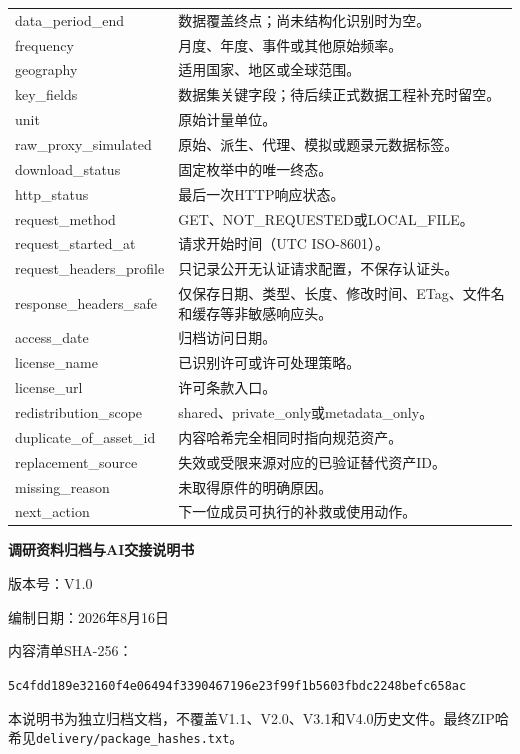 \documentclass[UTF8,openany,oneside,11pt]{ctexbook}
\begin{document}
\begin{longtable}{L{4cm}L{11.6cm}}
data\_\allowbreak{}period\_\allowbreak{}end & 数据覆盖终点；尚未结构化识别时为空。 \\
frequency & 月度、年度、事件或其他原始频率。 \\
geography & 适用国家、地区或全球范围。 \\
key\_\allowbreak{}fields & 数据集关键字段；待后续正式数据工程补充时留空。 \\
unit & 原始计量单位。 \\
raw\_\allowbreak{}proxy\_\allowbreak{}simulated & 原始、派生、代理、模拟或题录元数据标签。 \\
download\_\allowbreak{}status & 固定枚举中的唯一终态。 \\
http\_\allowbreak{}status & 最后一次HTTP响应状态。 \\
request\_\allowbreak{}method & GET、NOT\_REQUESTED或LOCAL\_FILE。 \\
request\_\allowbreak{}started\_\allowbreak{}at & 请求开始时间（UTC ISO-8601）。 \\
request\_\allowbreak{}headers\_\allowbreak{}profile & 只记录公开无认证请求配置，不保存认证头。 \\
response\_\allowbreak{}headers\_\allowbreak{}safe & 仅保存日期、类型、长度、修改时间、ETag、文件名和缓存等非敏感响应头。 \\
access\_\allowbreak{}date & 归档访问日期。 \\
license\_\allowbreak{}name & 已识别许可或许可处理策略。 \\
license\_\allowbreak{}url & 许可条款入口。 \\
redistribution\_\allowbreak{}scope & shared、private\_only或metadata\_only。 \\
duplicate\_\allowbreak{}of\_\allowbreak{}asset\_\allowbreak{}id & 内容哈希完全相同时指向规范资产。 \\
replacement\_\allowbreak{}source & 失效或受限来源对应的已验证替代资产ID。 \\
missing\_\allowbreak{}reason & 未取得原件的明确原因。 \\
next\_\allowbreak{}action & 下一位成员可执行的补救或使用动作。 \\
\bottomrule\end{longtable}

\clearpage\thispagestyle{empty}\centering\vspace*{4cm}
{\LARGE\bfseries 调研资料归档与AI交接说明书\par}\vspace{1cm}
{\Large 版本号：V1.0\par}\vspace{0.5cm}
编制日期：2026年8月16日\par
内容清单SHA-256：\par\nolinkurl{5c4fdd189e32160f4e06494f3390467196e23f99f1b5603fbdc2248befc658ac}\par
\vfill
本说明书为独立归档文档，不覆盖V1.1、V2.0、V3.1和V4.0历史文件。最终ZIP哈希见\texttt{delivery/package\_hashes.txt}。
\end{document}
